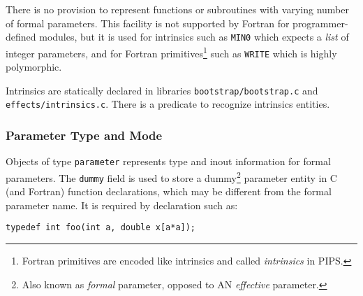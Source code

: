 \documentclass[a4paper]{article}
\begin{document}
\begin{comment}
Le domaine \verb/functional/ repr�sente le type d'un module,
c'est-�-dire une fonction, une subroutine ou un programme principal. Le
sous-domaine \verb/parameters/ donne le type et le mode de passage de
chaque param�tre, et le sous-domaine \verb/result/ donne le type du
r�sultat. Ce dernier type vaut \verb/void/ pour les subroutines et les
programmes principaux.
\end{comment}

There is no provision to represent functions or subroutines with varying
number of formal parameters. This facility is not supported by Fortran
for programmer-defined modules, but it is used for intrinsics such as
\verb+MIN0+ which expects a \emph{list} of integer parameters, and for
Fortran primitives\footnote{Fortran primitives are encoded like
intrinsics and called \emph{intrinsics} in PIPS.} such as \texttt{WRITE}
which is highly polymorphic.

\begin{comment}
Il n'y a pas de moyens simples pour repr�senter les fonctions ou
sous-programmes � nombre variable de param�tres. Bien que ce soit
interdit pour les modules d�finis par le programmeur, de nombreux
intrins�ques comme \verb+MIN0+ ou \verb+WRITE+ n'ont pas un profil
unique.
\end{comment}

Intrinsics are statically declared in libraries
\verb+bootstrap/bootstrap.c+ and \verb+effects/intrinsics.c+. There is a
predicate to recognize intrinsics entities.

\subsubsection{Parameter Type and Mode}
\label{subsubsection-parameter}


Objects of type \texttt{parameter} represents type and inout
information for formal parameters. The \verb/dummy/ field is used to
store a dummy\footnote{Also known as {\em formal} parameter, opposed
  to AN {\em effective} parameter.} parameter entity in C (and Fortran)
function declarations, which may be different from the formal
parameter name. It is required by declaration such as:

\begin{verbatim}
typedef int foo(int a, double x[a*a]);
\end{verbatim}
\end{document}
